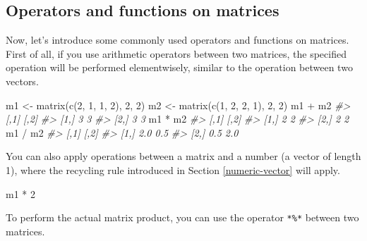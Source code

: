 \documentclass[
]{book}
\newenvironment{Shaded}{\begin{snugshade}}{\end{snugshade}}
\newcommand{\CommentTok}[1]{\textcolor[rgb]{0.56,0.35,0.01}{\textit{#1}}}
\newcommand{\DecValTok}[1]{\textcolor[rgb]{0.00,0.00,0.81}{#1}}
\newcommand{\FunctionTok}[1]{\textcolor[rgb]{0.00,0.00,0.00}{#1}}
\newcommand{\NormalTok}[1]{#1}
\newcommand{\OtherTok}[1]{\textcolor[rgb]{0.56,0.35,0.01}{#1}}
\newcommand{\SpecialCharTok}[1]{\textcolor[rgb]{0.00,0.00,0.00}{#1}}
\begin{document}
\hypertarget{operators-and-functions-on-matrices}{%
\subsection{Operators and functions on matrices}\label{operators-and-functions-on-matrices}}

Now, let's introduce some commonly used operators and functions on matrices. First of all, if you use arithmetic operators between two matrices, the specified operation will be performed elementwisely, similar to the operation between two vectors.

\begin{Shaded}
\begin{Highlighting}[]
\NormalTok{m1 }\OtherTok{\textless{}{-}} \FunctionTok{matrix}\NormalTok{(}\FunctionTok{c}\NormalTok{(}\DecValTok{2}\NormalTok{, }\DecValTok{1}\NormalTok{, }\DecValTok{1}\NormalTok{, }\DecValTok{2}\NormalTok{), }\DecValTok{2}\NormalTok{, }\DecValTok{2}\NormalTok{)}
\NormalTok{m2 }\OtherTok{\textless{}{-}} \FunctionTok{matrix}\NormalTok{(}\FunctionTok{c}\NormalTok{(}\DecValTok{1}\NormalTok{, }\DecValTok{2}\NormalTok{, }\DecValTok{2}\NormalTok{, }\DecValTok{1}\NormalTok{), }\DecValTok{2}\NormalTok{, }\DecValTok{2}\NormalTok{)}
\NormalTok{m1 }\SpecialCharTok{+}\NormalTok{ m2}
\CommentTok{\#\textgreater{}      [,1] [,2]}
\CommentTok{\#\textgreater{} [1,]    3    3}
\CommentTok{\#\textgreater{} [2,]    3    3}
\NormalTok{m1 }\SpecialCharTok{*}\NormalTok{ m2}
\CommentTok{\#\textgreater{}      [,1] [,2]}
\CommentTok{\#\textgreater{} [1,]    2    2}
\CommentTok{\#\textgreater{} [2,]    2    2}
\NormalTok{m1 }\SpecialCharTok{/}\NormalTok{ m2}
\CommentTok{\#\textgreater{}      [,1] [,2]}
\CommentTok{\#\textgreater{} [1,]  2.0  0.5}
\CommentTok{\#\textgreater{} [2,]  0.5  2.0}
\end{Highlighting}
\end{Shaded}

You can also apply operations between a matrix and a number (a vector of length 1), where the recycling rule introduced in Section \ref{numeric-vector} will apply.

\begin{Shaded}
\begin{Highlighting}[]
\NormalTok{m1 }\SpecialCharTok{*} \DecValTok{2}
\end{Highlighting}
\end{Shaded}

To perform the actual matrix product, you can use the operator \texttt{*\%*} between two matrices.
\end{document}
